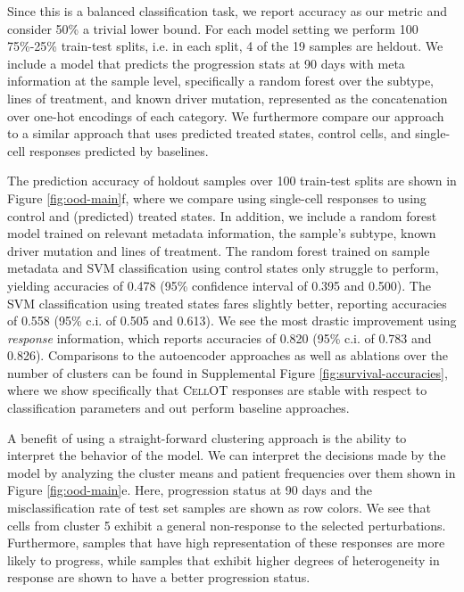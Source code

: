 Since this is a balanced classification task, we report accuracy as our metric and consider 50\% a trivial lower bound.
For each model setting we perform 100 75\%-25\% train-test splits, i.e. in each split, 4 of the 19 samples are heldout.
We include a model that predicts the progression stats at 90 days with meta information at the sample level, specifically a random forest over the subtype, lines of treatment, and known driver mutation, represented as the concatenation over one-hot encodings of each category.
We furthermore compare our approach to a similar approach that uses predicted treated states, control cells, and single-cell responses predicted by baselines.

The prediction accuracy of holdout samples over 100 train-test splits are shown in Figure \ref{fig:ood-main}f, where we compare using single-cell responses to using control and (predicted) treated states.
In addition, we include a random forest model trained on relevant metadata information, the sample’s subtype, known driver mutation and lines of treatment.
The random forest trained on sample metadata and SVM classification using control states only struggle to perform, yielding accuracies of 0.478 (95\% confidence interval of 0.395 and 0.500).
The SVM classification using treated states fares slightly better, reporting accuracies of 0.558 (95\% c.i. of 0.505 and 0.613).
We see the most drastic improvement using \emph{response} information, which reports accuracies of 0.820 (95\% c.i. of 0.783 and 0.826).
Comparisons to the autoencoder approaches as well as ablations over the number of clusters can be found in  Supplemental Figure \ref{fig:survival-accuracies}, where we show specifically that \textsc{CellOT} responses are stable with respect to classification parameters and out perform baseline approaches.

A benefit of using a straight-forward clustering approach is the ability to interpret the behavior of the model.
We can interpret the decisions made by the model by analyzing the cluster means and patient frequencies over them shown in Figure \ref{fig:ood-main}e.
Here, progression status at 90 days and the misclassification rate of test set samples are shown as row colors.
We see that cells from cluster 5 exhibit a general non-response to the selected perturbations.
Furthermore, samples that have high representation of these responses are more likely to progress,
while samples that exhibit higher degrees of heterogeneity in response are shown to have a better progression status.


